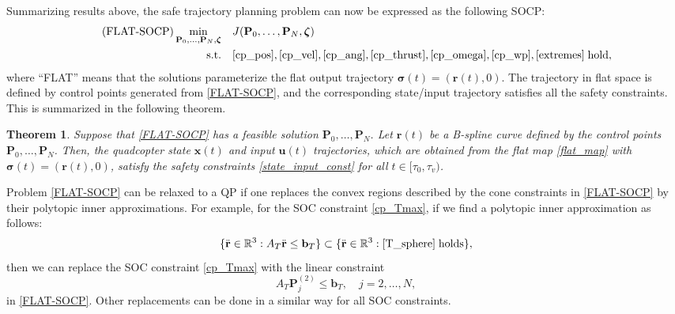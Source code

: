 \documentclass[journal,10pt]{IEEEtran}
\newtheorem{theorem}{\bfseries Theorem}
\newcommand{\vect}[1]{\boldsymbol{\mathbf{#1}}}
\newif\ifdraft
\newcommand{\XX}[1]{\ifdraft{\color{red}[{\bf XX}: #1]}\fi}
\newcommand{\VF}[1]{\ifdraft{\color{blue}[{\bf VF}: #1]}\fi}
\begin{document}


Summarizing results above, the safe trajectory planning problem can  now be expressed as the following  SOCP:
\begin{align} \label{FLAT-SOCP}
\tag{FLAT-SOCP}
    \min_{\vect{P}_{0},\dots,\vect{P}_{N},\vect{\zeta}} \quad &J(\vect{P}_0,\dots,\vect{P}_N,\vect{\zeta}) \\
    \text{s.t.} \quad & \eqref{cp_pos},\eqref{cp_vel},\eqref{cp_ang},\eqref{cp_thrust},\eqref{cp_omega},\eqref{cp_wp},\eqref{extremes}\;\text{hold},\nonumber
\end{align}
where ``FLAT'' means that the solutions parameterize the flat output trajectory $\vect{\sigma}(t) = (\vect{r}(t),0)$. %
The trajectory in flat space is defined by control points generated from \eqref{FLAT-SOCP}, and the corresponding state/input trajectory satisfies all the safety constraints. This is summarized in the following theorem.
\begin{theorem}\label{thm1}
Suppose that \eqref{FLAT-SOCP} has a feasible solution $\vect{P}_0,\dots, \vect{P}_N$. Let $\vect{r}(t)$ be a B-spline curve defined by the control points $\vect{P}_0,\dots, \vect{P}_N$. Then, the quadcopter state $\vect{x}(t)$ and input $\vect{u}(t)$ trajectories, which are obtained from the flat map \eqref{flat_map} with $\vect{\sigma}(t) = (\vect{r}(t),0)$,
satisfy the safety constraints \eqref{state_input_const} for all $t\in[\tau_0,\tau_v)$.%
\end{theorem}


Problem \eqref{FLAT-SOCP} can be relaxed to a QP if one replaces the convex regions described by the cone constraints in \eqref{FLAT-SOCP} by their polytopic inner approximations. For example, for the SOC constraint \eqref{cp_Tmax}, if we find a polytopic inner approximation as follows: 
$$
\{\ddot{\vect{r}}\in\mathbb{R}^3:A_T\ddot{\vect{r}}\leq \vect{b}_{T}\}\subset\{\ddot{\vect{r}}\in\mathbb{R}^3:\eqref{T_sphere}\;\mbox{holds}\},
$$
then we can replace the SOC constraint \eqref{cp_Tmax} with the linear constraint 
$$
A_T\vect{P}_j^{(2)}\leq \vect{b}_T,\quad  j=2,\dots,N,
$$ 
in \eqref{FLAT-SOCP}. Other replacements can be done in a similar way for all SOC constraints. 
\end{document}
